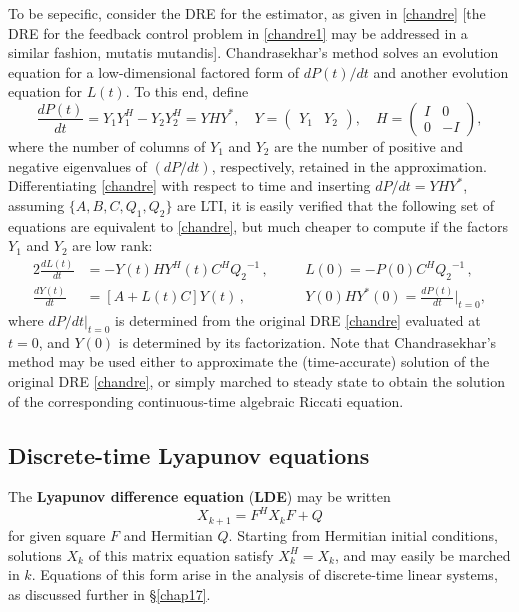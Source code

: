To be sepecific, consider the DRE for the estimator, as given in \eqref{chandre} [the DRE for the feedback control problem in \eqref{chandre1} may be addressed in a similar fashion,
{mutatis mutandis}].
Chandrasekhar's method solves an evolution equation for a
low-dimensional factored form of $dP(t)/dt$ and another
evolution equation for $L(t)$.  To this end, define
\begin{equation*}
\frac{dP(t)}{dt} = {Y}_1 {Y}_1^H - {Y}_2 {Y}_2^H = {Y} {H} {Y}^{*}, \quad
{Y}=\begin{pmatrix} {Y}_{1} & {Y}_{2} \end{pmatrix}, \quad
{H}=\begin{pmatrix} {I} & 0 \\ 0 & -{I} \end{pmatrix},
\end{equation*}
where the number of columns of ${Y}_1$ and $Y_2$ are the number of
positive and negative eigenvalues of $(dP/dt)$, respectively,
retained in the approximation. Differentiating \eqref{chandre} with
respect to time and inserting $dP/dt={Y} {H} {Y}^{*}$, assuming
$\{A,B,C,Q_{1},Q_{2}\}$ are LTI, it is easily verified that the
following set of equations are equivalent to \eqref{chandre}, but
much cheaper to compute if the factors $Y_1$ and $Y_2$ are low rank:
\begin{alignat*}{2}
\frac{dL(t)}{dt}&=-{Y}(t) {H} {Y}^H(t) {C}^H{Q_{2}}^{-1} \, ,\quad &&
{L}(0)=-{P}(0){C}^H{Q_{2}}^{-1} \, ,\\
\frac{dY(t)}{dt}&=[{A}+{L}(t){C}]{Y}(t) \,  ,\quad && {Y}(0) {H}
{Y}^{*}(0)=\frac{dP(t)}{dt}\Big|_{t=0},
\end{alignat*}
where $dP/dt|_{t=0}$ is determined from the original DRE
\eqref{chandre} evaluated at $t=0$, and $Y(0)$ is determined by its factorization. Note that Chandrasekhar's method may be used either to approximate the (time-accurate)
solution of the original DRE \eqref{chandre}, or simply marched to steady state to obtain the solution of the corresponding continuous-time algebraic Riccati equation.

\subsection{Discrete-time Lyapunov equations}\label{sec:DTLE}

The {\bf Lyapunov difference equation} ({\bf LDE}) may be written
\begin{equation}
X_{k+1} = F^H X_k F + Q
\label{eq:LDE}
\end{equation}
for given square $F$ and Hermitian $Q$.
Starting from Hermitian initial conditions, solutions $X_k$ of this matrix equation satisfy $X^H_k=X_k$,
and may easily be marched in $k$.
Equations of this form arise in the analysis of discrete-time linear systems, as discussed further in \S \ref{chap17}.   

